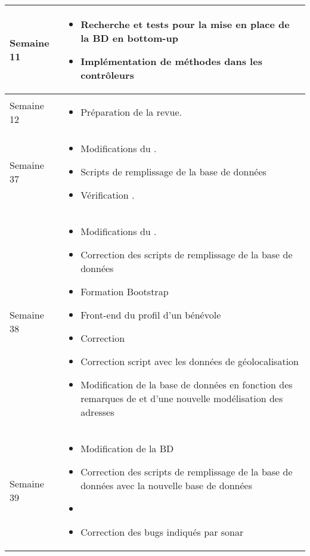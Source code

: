 \documentclass [a4paper] {article}
\begin{document}
\begin{longtable}{|>{\columncolor{gray!40}}p{2cm}|p{12cm}|}
	Semaine 11 & \begin{itemize}
		\item Recherche et tests pour la mise en place de la BD en bottom-up
		\item Implémentation de méthodes dans les contrôleurs
		\end{itemize} \\
	\hline
	Semaine 12 & \begin{itemize}
	\item Préparation de la revue.
	\end{itemize} \\
	\hline
	
	Semaine 37 & \begin{itemize}
	\item Modifications du \PGCCourt .
	\item Scripts de remplissage de la base de données
	\item Vérification \CRTPCourt.
	\end{itemize} \\
	\hline
	
	Semaine 38 & \begin{itemize}
	\item Modifications du \PGCCourt .
	\item Correction des scripts de remplissage de la base de données
	\item Formation Bootstrap
	\item Front-end du profil d'un bénévole
	\item Correction \CRTP
	\item Correction script avec les données de géolocalisation
	\item Modification de la base de données en fonction des remarques de \nomTuteurPedago et d'une nouvelle modélisation des adresses
	\end{itemize} \\
	\hline

	Semaine 39 & \begin{itemize}
	\item Modification de la BD
	\item Correction des scripts de remplissage de la base de données avec la nouvelle base de données
	\item \CTFT
	\item Correction des bugs indiqués par sonar
	\end{itemize} \\
	\hline



\end{longtable}
\end{document}
